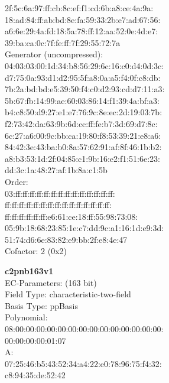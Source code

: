     2f:5c:6a:97:ff:cb:8c:ef:f1:cd:6b:a8:ce:4a:9a:\\
    18:ad:84:ff:ab:bd:8e:fa:59:33:2b:e7:ad:67:56:\\
    a6:6e:29:4a:fd:18:5a:78:ff:12:aa:52:0e:4d:e7:\\
    39:ba:ca:0c:7f:fe:ff:7f:29:55:72:7a\\
Generator (uncompressed):\\
    04:03:03:00:1d:34:b8:56:29:6c:16:c0:d4:0d:3c:\\
    d7:75:0a:93:d1:d2:95:5f:a8:0a:a5:f4:0f:c8:db:\\
    7b:2a:bd:bd:e5:39:50:f4:c0:d2:93:cd:d7:11:a3:\\
    5b:67:fb:14:99:ae:60:03:86:14:f1:39:4a:bf:a3:\\
    b4:c8:50:d9:27:e1:e7:76:9c:8e:ec:2d:19:03:7b:\\
    f2:73:42:da:63:9b:6d:cc:ff:fe:b7:3d:69:d7:8c:\\
    6c:27:a6:00:9c:bb:ca:19:80:f8:53:39:21:e8:a6:\\
    84:42:3e:43:ba:b0:8a:57:62:91:af:8f:46:1b:b2:\\
    a8:b3:53:1d:2f:04:85:c1:9b:16:e2:f1:51:6e:23:\\
    dd:3c:1a:48:27:af:1b:8a:c1:5b\\
Order: \\
    03:ff:ff:ff:ff:ff:ff:ff:ff:ff:ff:ff:ff:ff:ff:\\
    ff:ff:ff:ff:ff:ff:ff:ff:ff:ff:ff:ff:ff:ff:ff:\\
    ff:ff:ff:ff:ff:ff:e6:61:ce:18:ff:55:98:73:08:\\
    05:9b:18:68:23:85:1e:c7:dd:9c:a1:16:1d:e9:3d:\\
    51:74:d6:6e:83:82:e9:bb:2f:e8:4e:47\\
Cofactor:  2 (0x2)\\
\item \textbf{ c2pnb163v1 }\\
EC-Parameters: (163 bit)\\
Field Type: characteristic-two-field\\
Basis Type: ppBasis\\
Polynomial:\\
    08:00:00:00:00:00:00:00:00:00:00:00:00:00:00:\\
    00:00:00:00:01:07\\
A:   \\
    07:25:46:b5:43:52:34:a4:22:e0:78:96:75:f4:32:\\
    c8:94:35:de:52:42\\
